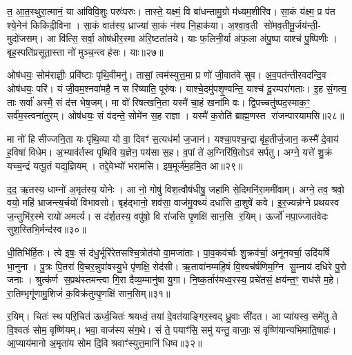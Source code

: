 त॒ आ॒त॒स्थुरा॒त्मानं॒ या आ॑विवि॒शुः परुः॑परुः। तास्ते॒ यक्ष्मं॒ वि बा॑धन्तामु॒ग्रो म॑ध्यम॒शीरि॑व। सा॒कं य॑क्ष्म॒ प्र प॑त श्ये॒नेन॑ किकिदी॒विना। सा॒कं वात॑स्य॒ ध्राज्या॑ सा॒कं न॑श्य नि॒हाक॑या। अ॒श्वा॒व॒ती सो॑मव॒तीमू॒र्जय॑न्ती॒- मुदो॑जसम्। आ वि॑त्सि॒ सर्वा॒ ओष॑धीर॒स्मा अ॑रि॒ष्टता॑तये। याः फ॒लिनी॒र्या अ॑फ॒ला अ॑पु॒ष्पा याश्च॑ पु॒ष्पिणीः। बृह॒स्पति॑प्रसूता॒स्ता नो॑ मुञ्च॒न्त्वह॑सः। याः॥२७॥

ओष॑धयः॒ सोम॑राज्ञीः॒ प्रवि॑ष्टाः पृथि॒वीमनु॑। तासां॒ त्वम॑स्युत्त॒मा प्र णो॑ जी॒वात॑वे सुव। अ॒व॒पत॑न्तीरवदन्दि॒व ओष॑धयः॒ परि॑। यं जी॒वम॒श्नवा॑महै॒ न स रि॑ष्याति॒ पूरु॑षः। याश्चे॒दमु॑पशृ॒ण्वन्ति॒ याश्च॑ दू॒रम्परा॑गताः। इ॒ह सं॒गत्य॒ ताः सर्वा॑ अस्मै॒ सं द॑त्त भेष॒जम्। मा वो॑ रिषत्खनि॒ता यस्मै॑ चा॒हं खना॑मि वः। द्वि॒पच्चतु॑ष्पद॒स्माक॒ꣳ॒ सर्व॑म॒स्त्वना॑तुरम्। ओष॑धयः॒ सं व॑दन्ते॒ सोमे॑न स॒ह राज्ञा। यस्मै॑ क॒रोति॑ ब्राह्म॒णस्त रा॑जन्पारयामसि॥२८॥

{\anuvakamend[{रपः॑ पत॒त्रिणी॒र्या अह॑सो॒ याः खना॑मि वो॒ऽष्टाद॑श च॥६॥}]}

मा नो॑ हिसीज्जनि॒ता यः पृ॑थि॒व्या यो वा॒ दिवꣳ॑ स॒त्यध॑र्मा ज॒जान॑। यश्चा॒पश्च॒न्द्रा बृ॑ह॒तीर्ज॒जान॒ कस्मै॑ दे॒वाय॑ ह॒विषा॑ विधेम। अ॒भ्याव॑र्तस्व पृथिवि य॒ज्ञेन॒ पय॑सा स॒ह। व॒पां ते॑ अ॒ग्निरि॑षि॒तोऽव॑ सर्पतु। अग्ने॒ यत्ते॑ शु॒क्रं यच्च॒न्द्रं यत्पू॒तं यद्य॒ज्ञियम्। तद्दे॒वेभ्यो॑ भरामसि। इष॒मूर्ज॑म॒हमि॒त आ॥२९॥

द॒द॒ ऋ॒तस्य॒ धाम्नो॑ अ॒मृत॑स्य॒ योनेः। आ नो॒ गोषु॑ विश॒त्वौष॑धीषु॒ जहा॑मि से॒दिमनि॑रा॒ममी॑वाम्। अग्ने॒ तव॒ श्रवो॒ वयो॒ महि॑ भ्राजन्त्य॒र्चयो॑ विभावसो। बृह॑द्भानो॒ शव॑सा॒ वाज॑मु॒क्थ्यं॑ दधा॑सि दा॒शुषे॑ कवे। इ॒र॒ज्यन्न॑ग्ने प्रथयस्व ज॒न्तुभि॑र॒स्मे रायो॑ अमर्त्य। स द॑र्\mbox{}श॒तस्य॒ वपु॑षो॒ वि रा॑जसि पृ॒णक्षि॑ सान॒सि र॒यिम्। ऊर्जो॑ नपा॒ज्जात॑वेदः सुश॒स्तिभि॒र्मन्द॑स्व॥३०॥

धी॒तिभि॑र्हि॒तः। त्वे इषः॒ सं द॑धु॒र्भूरि॑रेतसश्चि॒त्रोत॑यो वा॒मजा॑ताः। पा॒व॒कव॑र्चाः शु॒क्रव॑र्चा॒ अनू॑नवर्चा॒ उदि॑यर्\mbox{}षि भा॒नुना। पु॒त्रः पि॒तरा॑ वि॒चर॒न्नुपा॑वस्यु॒भे पृ॑णक्षि॒ रोद॑सी। ऋ॒तावा॑नम्महि॒षं वि॒श्वच॑र्\mbox{}षणिम॒ग्नि सु॒म्नाय॑ दधिरे पु॒रो जनाः। श्रुत्क॑र्ण स॒प्रथ॑स्तमन्त्वा गि॒रा दैव्य॒म्मानु॑षा यु॒गा। नि॒ष्क॒र्तार॑मध्व॒रस्य॒ प्रचे॑तसं॒ क्षय॑न्त॒ꣳ॒ राध॑से म॒हे। रा॒तिम्भृगू॑णामु॒शिजं॑ क॒विक्र॑तुम्पृ॒णक्षि॑ सान॒सिम्॥३१॥

र॒यिम्। चितः॑ स्थ परि॒चित॑ ऊर्ध्व॒चितः॑ श्रयध्वं॒ तया॑ दे॒वत॑याङ्गिर॒स्वद् ध्रु॒वाः सी॑दत। आ प्या॑यस्व॒ समे॑तु ते वि॒श्वतः॑ सोम॒ वृष्णि॑यम्। भवा॒ वाज॑स्य संग॒थे। सं ते॒ पयाꣳ॑सि॒ समु॑ यन्तु॒ वाजाः॒ सं वृष्णि॑यान्यभिमाति॒षाहः॑। आ॒प्याय॑मानो अ॒मृता॑य सोम दि॒वि श्रवाꣳ॑स्युत्त॒मानि॑ धिष्व॥३२॥

